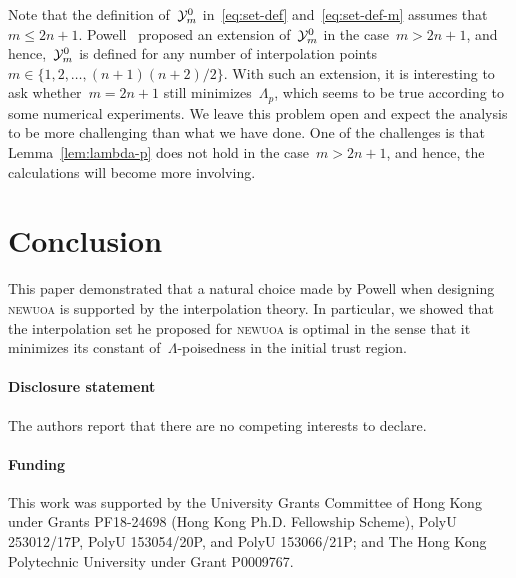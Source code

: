 \documentclass{article}
\numberwithin{equation}{section}
\theoremstyle{definition}
\theoremstyle{plain}
\theoremstyle{remark}
\newcommand*{\set}[2][]{#1\{#2#1\}}
\newcommand*{\solvername}[1]{\textsc{#1}\xspace}
\newcommand*{\xpt}[1][]{\mathcal{Y}\ifblank{#1}{}{^{#1}}}
\begin{document}
Note that the definition of~$\xpt[0]_m$ in~\eqref{eq:set-def} and~\eqref{eq:set-def-m} assumes that~$m \le 2n + 1$.
Powell~\cite{Powell_2006} proposed an extension of~$\xpt[0]_m$ in the case~$m > 2n + 1$, and hence,~$\xpt[0]_m$ is defined for any number of interpolation points~$m \in \set{1, 2, \dots, (n + 1) (n + 2) / 2}$.
With such an extension, it is interesting to ask whether~$m = 2n + 1$ still minimizes~$\Lambda_p$, which seems to be true according to some numerical experiments.
We leave this problem open and expect the analysis to be more challenging than what we have done.
One of the challenges is that Lemma~\ref{lem:lambda-p} does not hold in the case~$m > 2n + 1$, and hence, the calculations will become more involving.

\section{Conclusion}

This paper demonstrated that a natural choice made by Powell when designing \solvername{newuoa} is supported by the interpolation theory.
In particular, we showed that the interpolation set he proposed for \solvername{newuoa} is optimal in the sense that it minimizes its constant of~$\Lambda$-poisedness in the initial trust region.

\paragraph*{Disclosure statement}
The authors report that there are no competing interests to declare.

\paragraph*{Funding}
This work was supported by the University Grants Committee of Hong Kong under Grants PF18-24698 (Hong Kong Ph.D. Fellowship Scheme), PolyU 253012/17P, PolyU 153054/20P, and PolyU 153066/21P; and The Hong Kong Polytechnic University under Grant P0009767.



\end{document}
